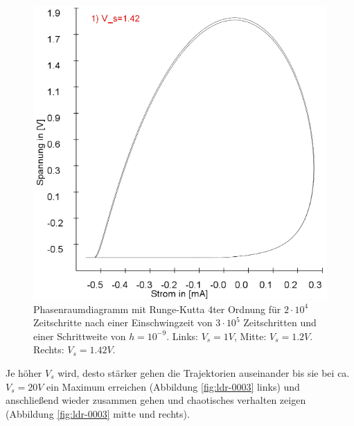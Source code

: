 \documentclass[12pt,a4paper]{article}
\begin{document}
\begin{figure}[!htbp]
\includegraphics[scale=0.28]{schwing-runge-nach300k-weitere20k-10-9-1,42V}
\caption{Phasenraumdiagramm mit Runge-Kutta 4ter Ordnung für $2\cdot10^4$ Zeitschritte nach einer Einschwingzeit von  $3\cdot10^5$ Zeitschritten und einer Schrittweite von $h=10^{-9}$. Links: $V_s=1V$, Mitte: $V_s=1.2V$. Rechts: $V_s=1.42V$.}
\label{fig:ldr-0002}
\end{figure}
Je höher $V_s$ wird, desto stärker gehen die Trajektorien auseinander bis sie bei ca. $V_s=20V$ ein Maximum erreichen (Abbildung \ref{fig:ldr-0003} links) und anschließend wieder zusammen gehen und chaotisches verhalten zeigen (Abbildung \ref{fig:ldr-0003} mitte und rechts).
\end{document}
